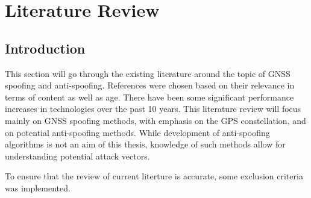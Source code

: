 
\chapter{Literature Review} %

\label{Chapter3} %


\section{Introduction}
This section will go through the existing literature around the topic of GNSS spoofing and anti-spoofing. References were chosen based on their relevance in terms of
content as well as age. There have been some significant performance increases in technologies over the past 10 years.
This literature review will focus mainly on GNSS spoofing methods, with emphasis on the GPS constellation, and on potential anti-spoofing methods. While development of
anti-spoofing algorithms is not an aim of this thesis, knowledge of such methods allow for understanding potential attack vectors.

To ensure that the review of current literture is accurate, some exclusion criteria was implemented.

